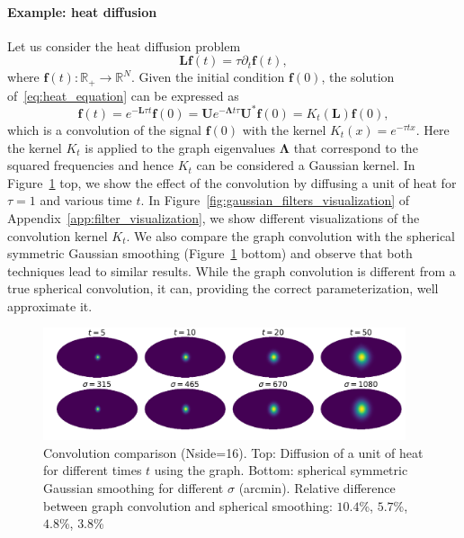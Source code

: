 \documentclass[final,twocolumn,3p,times,authoryear]{elsarticle}
\renewcommand{\b}[1]{{\bm{#1}}}   %
\newcommand{\1}{\b{1}}              %
\newcommand{\0}{\b{0}}              %
\newcommand{\g}[1]{\b{#1}}
\renewcommand{\L}{\b{L}} %
\newcommand{\U}{\b{U}}
\newcommand{\bLambda}{\b{\Lambda}}
\begin{document}
\paragraph{Example: heat diffusion}
Let us consider the heat diffusion problem 
\begin{equation} \label{eq:heat_equation}
\L \b{f}(t) = \tau \partial_t \b{f}(t),
\end{equation}
where $\b{f}(t): \mathbb{R}_+ \rightarrow \mathbb{R}^N$. Given the initial condition 
$\b{f}(0)$, the solution of~\ref{eq:heat_equation} can be expressed as
\begin{equation}
\b{f}(t) = e^{-\L \tau t} \b{f}(0) = \U e^{-\bLambda t \tau} \U^* \g{f}(0) = K_t(\L) \b{f}(0), 
\end{equation}
which is a convolution of the signal $\b{f}(0)$ with the kernel $K_t(x)=e^{-\tau
t x}$. Here the kernel $K_t$ is applied to the graph eigenvalues $\bLambda$ that
correspond to the squared frequencies and hence $K_t$ can be considered a
Gaussian kernel. In Figure~\ref{fig:gaussian_filters_comparizon} top, we show
the effect of the convolution by diffusing a unit of heat for $\tau=1$ and various 
time $t$. In  Figure~\ref{fig:gaussian_filters_visualization} of
Appendix~\ref{app:filter_visualization}, we show different visualizations of the
convolution kernel $K_t$. We also compare the graph convolution with the
spherical symmetric Gaussian smoothing
(Figure~\ref{fig:gaussian_filters_comparizon} bottom) and observe that both
techniques lead to similar results. While the graph convolution is different
from a true spherical convolution, it can, providing the correct
parameterization, well approximate it.

\begin{figure}[!ht]
\centering
\includegraphics[width=0.95\textwidth]{figures/gaussian_filters_sphere.pdf}
\caption{Convolution comparison (Nside=16). 
Top: Diffusion of a unit of heat for different times $t$ using the graph. 
Bottom: spherical symmetric Gaussian smoothing for different $\sigma$ (arcmin). 
Relative difference between graph convolution and spherical smoothing: $10.4$\%, $5.7$\%, $4.8$\%, $3.8$\% }
\label{fig:gaussian_filters_comparizon}
\end{figure}
\end{document}

